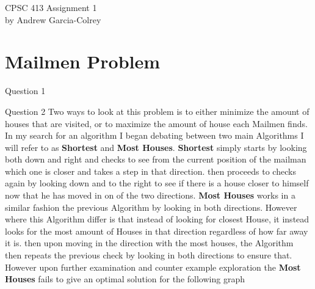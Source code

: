 \documentclass[10pt]{article}
\author{Andrew}
\date{text }
\begin{document}
\begin{center}
CPSC 413 Assignment 1 \\
by Andrew Garcia-Colrey
\end{center}
\part{Mailmen Problem}
Question 1
\begin{center}
\end{center}
Question 2
\hfill \break
\break
Two ways to look at this problem is to either minimize the amount of houses that are visited, or to maximize the amount of house each Mailmen finds. In my search for an algorithm I began debating between two main Algorithms I will refer to as \textbf{Shortest}  and \textbf{Most Houses}. 
\hfill \break
\break
\textbf{Shortest} simply starts by looking both down and right and checks to see from the current position of the mailman which one is closer and takes a step in that direction. then proceeds to checks again by looking down and to the right to see if there is a house closer to himself now that he has moved in on of the two directions.
\hfill \break
\break
 \textbf{Most Houses} works in a similar fashion the previous Algorithm by looking in both directions. However where this Algorithm differ is that instead of looking for closest House, it instead looks for the most amount of Houses in that direction regardless of how far away it is. then upon moving in the direction with the most houses, the Algorithm then repeats the previous check by looking in both directions to ensure that.
 \hfill \break
\break
However upon further examination and counter example exploration the  \textbf{Most Houses} fails to give an optimal solution for the following graph
\end{document}
